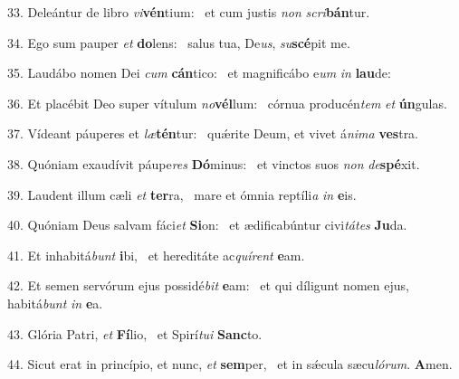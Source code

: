 33. Deleántur de libro \textit{vi}\textbf{vén}tium: \ast\  et cum justis \textit{non} \textit{scri}\textbf{bán}tur.\

34. Ego sum pauper \textit{et} \textbf{do}lens: \ast\  salus tua, De\textit{us}, \textit{su}\textbf{scé}pit me.\

35. Laudábo nomen Dei \textit{cum} \textbf{cán}tico: \ast\  et magnificábo e\textit{um} \textit{in} \textbf{lau}de:\

36. Et placébit Deo super vítulum \textit{no}\textbf{vél}lum: \ast\  córnua producén\textit{tem} \textit{et} \textbf{ún}gulas.\

37. Vídeant páuperes et \textit{læ}\textbf{tén}tur: \ast\  quǽrite Deum, et vivet á\textit{ni}\textit{ma} \textbf{ves}tra.\

38. Quóniam exaudívit páupe\textit{res} \textbf{Dó}minus: \ast\  et vinctos suos \textit{non} \textit{de}\textbf{spé}xit.\

39. Laudent illum cæli \textit{et} \textbf{ter}ra, \ast\  mare et ómnia reptíli\textit{a} \textit{in} \textbf{e}is.\

40. Quóniam Deus salvam fáci\textit{et} \textbf{Si}on: \ast\  et ædificabúntur civi\textit{tá}\textit{tes} \textbf{Ju}da.\

41. Et inhabitá\textit{bunt} \textbf{i}bi, \ast\  et hereditáte ac\textit{quí}\textit{rent} \textbf{e}am.\

42. Et semen servórum ejus possidé\textit{bit} \textbf{e}am: \ast\  et qui díligunt nomen ejus, habitá\textit{bunt} \textit{in} \textbf{e}a.\

43. Glória Patri, \textit{et} \textbf{Fí}lio, \ast\  et Spirí\textit{tu}\textit{i} \textbf{Sanc}to.\

44. Sicut erat in princípio, et nunc, \textit{et} \textbf{sem}per, \ast\  et in sǽcula sæcu\textit{ló}\textit{rum}. \textbf{A}men.\

